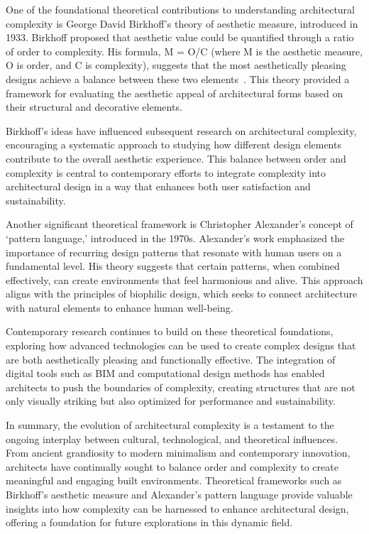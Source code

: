 One of the foundational theoretical contributions to understanding architectural complexity is George David Birkhoff's theory of aesthetic measure, introduced in 1933. Birkhoff proposed that aesthetic value could be quantified through a ratio of order to complexity. His formula, M = O/C (where M is the aesthetic measure, O is order, and C is complexity), suggests that the most aesthetically pleasing designs achieve a balance between these two elements~\cite{Birkhoff1933}. This theory provided a framework for evaluating the aesthetic appeal of architectural forms based on their structural and decorative elements.

Birkhoff's ideas have influenced subsequent research on architectural complexity, encouraging a systematic approach to studying how different design elements contribute to the overall aesthetic experience. This balance between order and complexity is central to contemporary efforts to integrate complexity into architectural design in a way that enhances both user satisfaction and sustainability.

Another significant theoretical framework is Christopher Alexander's concept of `pattern language,' introduced in the 1970s.
Alexander's work emphasized the importance of recurring design patterns that resonate with human users on a fundamental level.
His theory suggests that certain patterns, when combined effectively, can create environments that feel harmonious and alive.
This approach aligns with the principles of biophilic design, which seeks to connect architecture with natural elements to enhance human well-being.

Contemporary research continues to build on these theoretical foundations, exploring how advanced technologies can be used to create complex designs that are both aesthetically pleasing and functionally effective. The integration of digital tools such as BIM and computational design methods has enabled architects to push the boundaries of complexity, creating structures that are not only visually striking but also optimized for performance and sustainability.

In summary, the evolution of architectural complexity is a testament to the ongoing interplay between cultural, technological, and theoretical influences. From ancient grandiosity to modern minimalism and contemporary innovation, architects have continually sought to balance order and complexity to create meaningful and engaging built environments. Theoretical frameworks such as Birkhoff's aesthetic measure and Alexander's pattern language provide valuable insights into how complexity can be harnessed to enhance architectural design, offering a foundation for future explorations in this dynamic field.


